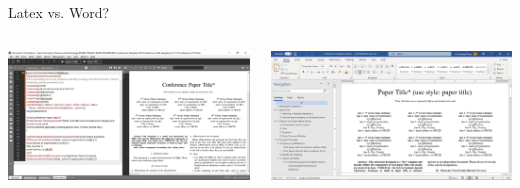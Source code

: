 \begin{frame}{Latex vs. Word?}
	\begin{columns}
		\begin{column}{0.6\textwidth}
	\includegraphics[width=0.9\linewidth]{figs/latex_code}
		\end{column}
		
		\begin{column}{0.4\textwidth}
	\includegraphics[width=1.0\linewidth]{figs/latex_code1}
		\end{column}
	\end{columns}
\end{frame}


